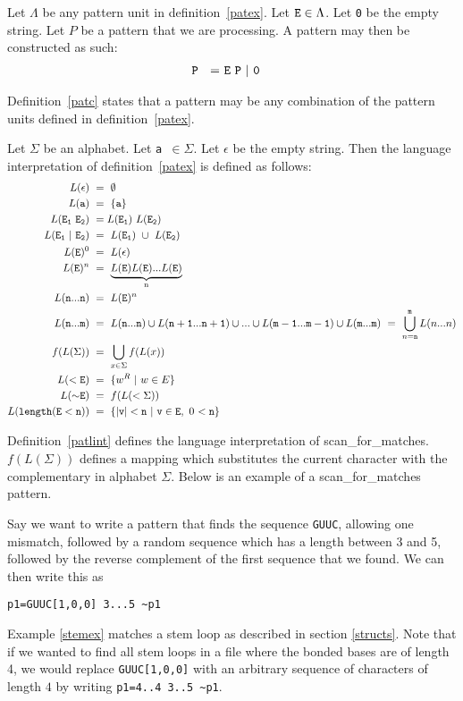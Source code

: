 \begin{mydef}\label{patc}
Let $\Lambda$ be any pattern unit in definition~\ref{patex}. Let ${\tt E}\in\Lambda$.
Let {\tt 0} be the empty string. Let $P$ be a pattern that we are processing.
A pattern may then be constructed as such: 
\begin{align*}
{\tt P~}~=&~{\tt E~P~|~0}
\end{align*}
\end{mydef}
Definition~\ref{patc} states that a pattern may be any combination of the pattern 
units defined in definition~\ref{patex}.
\begin{mydef}\label{patlint}
Let $\Sigma$ be an alphabet. Let {\tt a $\in\Sigma$}. Let $\epsilon$ be the empty 
string.
Then the language interpretation of definition~\ref{patex} is defined as follows:
\begin{align*}
L({\tt \epsilon})~&=~\emptyset\\
L({\tt a})~&=~\{{\tt a}\}\\
L({\tt E_1~E_2})~&=L({\tt E_1})~L({\tt E_2})\\
L({\tt E_1~|~E_2})~&=~L({\tt E}_{\tt 1})~\cup~L({\tt E}_{\tt 2})\\
L({\tt E})^0~&=~L({\tt \epsilon})\\
L({\tt E})^n~&=~\underbrace{L({\tt E})L({\tt E})...L({\tt E})}_\text{n}\\
L({\tt n...n})~&=~L({\tt E})^n\\
L({\tt n...m})~&=~L({\tt n...n})\cup L({\tt n+1...n+1})\cup...\cup L({\tt m-1...m-1})\cup L({\tt m...m})~=~\bigcup\limits_{n={\tt n}}^{\tt m} L(n...n)\\
f(L(\Sigma))~&=~\bigcup\limits_{x\in\Sigma} f(L(x))\\ %
L({\tt <E})~&=~\{w^R~|~w\in E\}\\
L({\tt {\sim}E})~&=~f(L(<\Sigma))\\
L({\tt length(E<n)} )~&=~\{{\tt |v|<n~|~v\in E},~0~{\tt <n}\}
\end{align*}
\end{mydef}
Definition~\ref{patlint} defines the language interpretation of 
scan\_for\_matches. $f(L(\Sigma))$ defines a mapping \cite[p. 60]{Hopcroft1979} 
which substitutes the current character with the complementary in alphabet 
$\Sigma$.
Below is an example of a scan\_for\_matches pattern.
\begin{myex}\label{stemex}
Say we want to write a pattern that finds the sequence {\tt GUUC}, allowing 
one mismatch, followed by a random sequence which has a length between 3 and 5, 
followed by the reverse complement of the first sequence that we found. We can 
then write this as \begin{center}
{\tt p1=GUUC[1,0,0] 3...5 \textasciitilde p1}
\end{center}
\end{myex}
Example \ref{stemex} matches a stem loop as described in section 
\ref{structs}. Note that if we wanted to find all stem loops in a file where 
the bonded bases are of length 
4, we would replace {\tt GUUC[1,0,0]} with an arbitrary sequence of characters of length $4$ 
by writing {\tt p1=4..4 3..5 \textasciitilde p1}.
